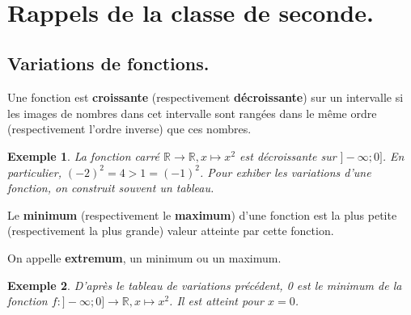 \documentclass[a4paper,11pt]{article}
\title{}
\author{}
\date{}
\newcommand{\R}{\mathbb{R}}
\theoremstyle{break}
\newtheorem{Ex}{Exemple}
\newcounter{numero}
\newcommand{\exo}{
  \addtocounter{numero}{1}%
  \textbf{\underline{Exercice \arabic{numero}:}}\quad}
\begin{document}
  \setlength{\unitlength}{1mm}
  \setlength\parindent{0mm}
  
  
  ~
  \medskip
  
  \section{Rappels de la classe de seconde.}
  
  \subsection{Variations de fonctions.}
  
  \begin{Def}
    Une fonction est \textbf{croissante} (respectivement \textbf{décroissante}) sur un
    intervalle si les images de nombres dans cet intervalle sont rangées dans le même
    ordre (respectivement l'ordre inverse) que ces nombres.
  \end{Def}
  
  \begin{Ex}
    La fonction carré $\R \to \R, x \mapsto x^2$ est décroissante sur $]-\infty;0]$. 
    En particulier, $(-2)^2=4>1=(-1)^2$. Pour exhiber les variations d'une fonction, 
    on construit souvent un tableau.
    
  \end{Ex}
  
  
  
  \begin{Def}
    Le \textbf{minimum} (respectivement le \textbf{maximum}) d’une fonction est la plus 
    petite (respectivement la plus grande) valeur atteinte par cette fonction.
    
    On appelle \textbf{extremum}, un minimum ou un maximum.
  \end{Def}
  
  \begin{Ex}
    D'après le tableau de variations précédent, 0 est le minimum de la fonction
    $f:]-\infty ; 0] \to \R, x \mapsto x^2$. Il est atteint pour $x=0$.
  \end{Ex}
  
\end{document}

